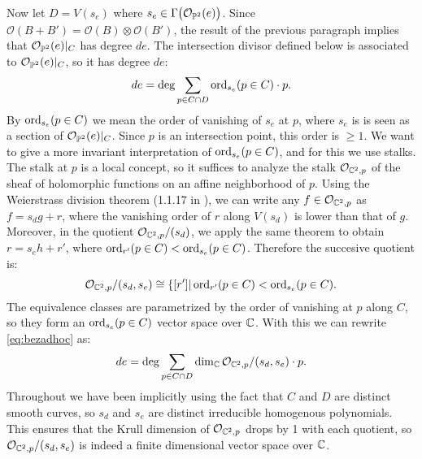 \documentclass{article}
\begin{document}
Now let $D = V(s_e)$ where $s_e \in \Gamma\big(\mathcal{O}_{\operatorname{\mathbb{P}}^2}(e)\big)$. Since $\mathcal{O}(B + B') =
\mathcal{O}(B) \otimes \mathcal{O}(B')$, the result of the previous paragraph implies that $\mathcal{O}_{\operatorname{\mathbb{P}}^2}(e)
|_C$ has degree $de$. The intersection divisor defined below is associated to $\mathcal{O}_{\operatorname{\mathbb{P}}^2}(e)|_C$, so it has
degree $de$:
\begin{equation}
\label{eq:bezadhoc}
	de = \deg \sum_{p \in C \cap D} \operatorname{ord}_{s_e} (p \in C)\cdot	p.
\end{equation}
By $\operatorname{ord}_{s_e} (p \in C)$ we mean the order of vanishing of $s_e$ at $p$, where $s_e$ is is seen as a section
of $\mathcal{O}_{\operatorname{\mathbb{P}}^2}(e)|_C$. Since $p$ is an intersection point, this order is $\geq 1$. We want to give a
more invariant interpretation of $\operatorname{ord}_{s_e} (p \in C)$, and for this we use stalks. The stalk at $p$ is a local
concept, so it suffices to analyze the stalk $\mathcal{O}_{\mathbb{C}^2, p}$ of the sheaf of holomorphic functions on an
affine neighborhood of $p$. Using the Weierstrass division theorem (1.1.17 in \cite{Huy}), we can write any
$f \in \mathcal{O}_{\mathbb{C}^2, p}$ as $f = s_d g + r$, where the vanishing order of $r$ along $V(s_d)$ is lower than
that of $g$. Moreover, in the quotient $\mathcal{O}_{\mathbb{C}^2, p}/(s_d)$, we apply the same theorem to obtain
$r = s_e h + r'$, where $\operatorname{ord}_{r'} (p \in C) < \operatorname{ord}_{s_e} (p \in C)$. Therefore the succesive quotient is:
\[	\mathcal{O}_{\mathbb{C}^2, p}/(s_d,s_e) \cong \{[r'] | \operatorname{ord}_{r'} (p \in C) < \operatorname{ord}_{s_e} (p \in C).	\]
The equivalence classes are parametrized by the order of vanishing at $p$ along $C$, so they form an
$\operatorname{ord}_{s_e} (p \in C)$ vector space over $\mathbb{C}$. With this we can rewrite \ref{eq:bezadhoc} as:
\[	de = \deg \sum_{p \in C \cap D} \dim_{\mathbb{C}} \mathcal{O}_{\mathbb{C}^2, p}/(s_d,s_e) \cdot	p.	\]
Throughout we have been implicitly using the fact that $C$ and $D$ are distinct smooth curves, so $s_d$ and $s_e$
are distinct irreducible homogenous polynomials. This ensures that the Krull dimension of $\mathcal{O}_{\mathbb{C}^2, p}$
drops by 1 with each quotient, so $\mathcal{O}_{\mathbb{C}^2, p}/(s_d,s_e)$ is indeed a finite dimensional vector space
over $\mathbb{C}$.
\end{document}

